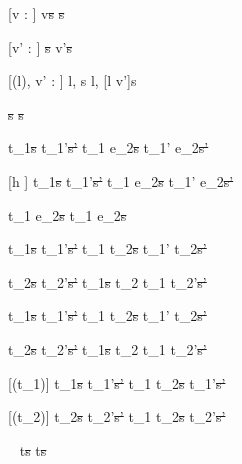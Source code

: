[v : \beta]
  { }
  {\Edit v\st{s} \handle{\Clear} \Fill \beta\st{s}}

[v' : \beta]
  { }
  {\Fill \beta\st{s}  \Edit v'\st{s}}

[\Sigma(l), v' : \beta]
  { }
  {\Store l, s  \Store l, [l \mapsto v']s}


  { }
  {\Fail\st{s}  \Fail\st{s}}


  {t_1\st{s}  t_1'\st{s'}}
  {t_1 \Then e_2\st{s}  t_1' \Then e_2\st{s'}}

[h \neq \Continue]
  {t_1\st{s}  t_1'\st{s'}}
  {t_1 \Next e_2\st{s}  t_1' \Next e_2\st{s'}}

  { }
  {t_1 \Next e_2\st{s} \handle{\Continue} t_1 \Then e_2\st{s}}


  {t_1\st{s}  t_1'\st{s'} }
  {t_1 \And t_2\st{s}  t_1' \And t_2\st{s'}}

  {t_2\st{s}  t_2'\st{s'} }
  {t_1\st{s} \And t_2  t_1 \And t_2'\st{s'}}


  {t_1\st{s}  t_1'\st{s'} }
  {t_1 \Or t_2\st{s}  t_1' \Or t_2\st{s'}}

  {t_2\st{s}  t_2'\st{s'} }
  {t_1\st{s} \Or t_2  t_1 \Or t_2'\st{s'}}


[\Succeeding(t_1)]
  {t_1\st{s}  t_1'\st{s'}}
  {t_1 \Xor t_2\st{s}  t_1'\st{s'}}

[\Succeeding(t_2)]
  {t_2\st{s}  t_2'\st{s'}}
  {t_1 \Xor t_2\st{s}  t_2'\st{s'}}

  {\ }
  {t\st{s} \handle{\Pick \Here} t\st{s}}









